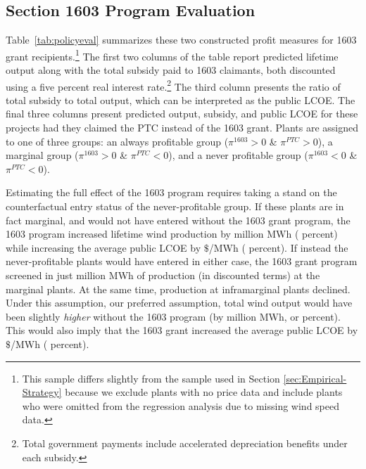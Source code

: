 \documentclass[12pt]{article}
\begin{document}
\subsection{Section 1603 Program Evaluation \label{Appendix:1603eval}}

Table~\ref{tab:policyeval} summarizes these two constructed profit measures for 1603 grant recipients.\footnote{This sample differs slightly from the sample used in Section \ref{sec:Empirical-Strategy} because we exclude plants with no price data and include plants who were omitted from the regression analysis due to missing wind speed data.} The first two columns of the table report predicted lifetime output along with the total subsidy paid to 1603 claimants, both discounted using a five percent real interest rate.\footnote{Total government payments include accelerated depreciation benefits under each subsidy.} The third column presents the ratio of total subsidy to total output, which can be interpreted as the public LCOE. The final three columns present predicted output, subsidy, and public LCOE for these projects had they claimed the PTC instead of the 1603 grant. Plants are assigned to one of three groups: an always profitable group ($\pi^{1603}>0$ \& $\pi^{PTC}>0$), a marginal group ($\pi^{1603}>0$ \& $\pi^{PTC}<0$), and a never profitable group ($\pi^{1603}<0$ \& $\pi^{PTC}<0$).

Estimating the full effect of the 1603 program requires taking a stand on the counterfactual entry status of the never-profitable group. If these plants are in fact marginal, and would not have entered without the 1603 grant program, the 1603 program increased lifetime wind production by million MWh ( \unskip percent) while increasing the average public LCOE by $\$  $/MWh ( \unskip percent). If instead the never-profitable plants would have entered in either case, the 1603 grant program screened in just million MWh of production (in discounted terms) at the marginal plants. At the same time, production at inframarginal plants declined. Under this assumption, our preferred assumption, total wind output would have been slightly \emph{higher} without the 1603 program (by million MWh, or percent). This would also imply that the 1603 grant increased the average public LCOE by $\$  $/MWh ( \unskip percent).
\end{document}
